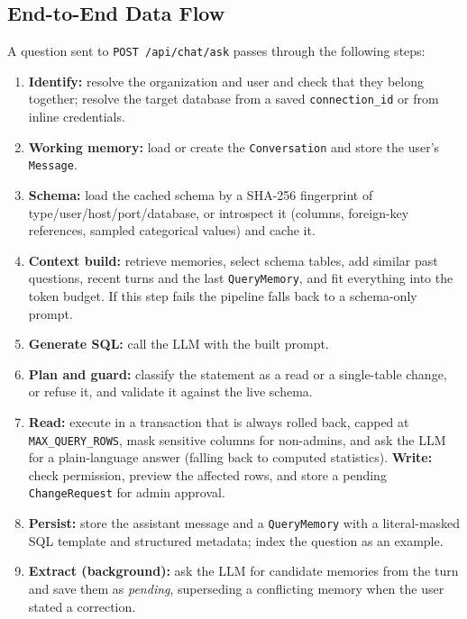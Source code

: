 \subsection{End-to-End Data Flow}
A question sent to \texttt{POST /api/chat/ask} passes through the following steps:
\begin{enumerate}[label=\arabic*., leftmargin=*, topsep=4pt, itemsep=4pt]
    \item \textbf{Identify:} resolve the organization and user and check that they belong
          together; resolve the target database from a saved \texttt{connection\_id} or
          from inline credentials.
    \item \textbf{Working memory:} load or create the \texttt{Conversation} and store the
          user's \texttt{Message}.
    \item \textbf{Schema:} load the cached schema by a SHA-256 fingerprint of
          type/user/host/port/database, or introspect it (columns, foreign-key references,
          sampled categorical values) and cache it.
    \item \textbf{Context build:} retrieve memories, select schema tables, add similar past
          questions, recent turns and the last \texttt{QueryMemory}, and fit everything into
          the token budget. If this step fails the pipeline falls back to a schema-only
          prompt.
    \item \textbf{Generate SQL:} call the LLM with the built prompt.
    \item \textbf{Plan and guard:} classify the statement as a read or a single-table
          change, or refuse it, and validate it against the live schema.
    \item \textbf{Read:} execute in a transaction that is always rolled back, capped at
          \texttt{MAX\_QUERY\_ROWS}, mask sensitive columns for non-admins, and ask the LLM
          for a plain-language answer (falling back to computed statistics).
          \textbf{Write:} check permission, preview the affected rows, and store a pending
          \texttt{ChangeRequest} for admin approval.
    \item \textbf{Persist:} store the assistant message and a \texttt{QueryMemory} with a
          literal-masked SQL template and structured metadata; index the question as an
          example.
    \item \textbf{Extract (background):} ask the LLM for candidate memories from the turn
          and save them as \textit{pending}, superseding a conflicting memory when the user
          stated a correction.
\end{enumerate}

